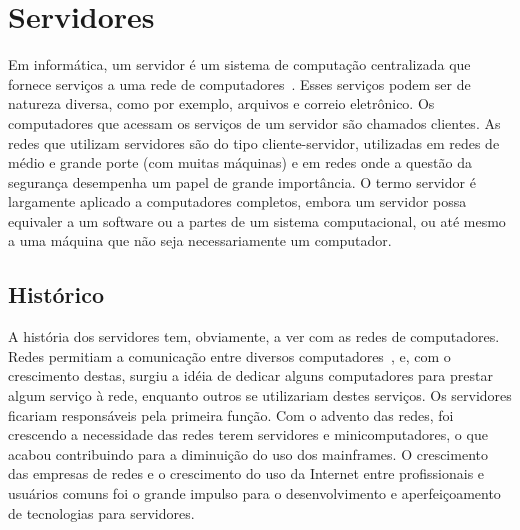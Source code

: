 
\chapter{Servidores}
Em informática, um servidor é um sistema de computação centralizada que fornece serviços a uma rede de computadores~\cite{hunt}. Esses serviços podem ser de natureza diversa, como por exemplo, arquivos e correio eletrônico. Os computadores que acessam os serviços de um servidor são chamados clientes. As redes que utilizam servidores são do tipo cliente-servidor, utilizadas em redes de médio e grande porte (com muitas máquinas) e em redes onde a questão da segurança desempenha um papel de grande importância. O termo servidor é largamente aplicado a computadores completos, embora um servidor possa equivaler a um software ou a partes de um sistema computacional, ou até mesmo a uma máquina que não seja necessariamente um computador.

\section{Histórico}
A história dos servidores tem, obviamente, a ver com as redes de computadores. Redes permitiam a comunicação entre diversos computadores~\cite{tanenbaum}, e, com o crescimento destas, surgiu a idéia de dedicar alguns computadores para prestar algum serviço à rede, enquanto outros se utilizariam destes serviços. Os servidores ficariam responsáveis pela primeira função.
Com o advento das redes, foi crescendo a necessidade das redes terem servidores e minicomputadores, o que acabou contribuindo para a diminuição do uso dos mainframes.
O crescimento das empresas de redes e o crescimento do uso da Internet entre profissionais e usuários comuns foi o grande impulso para o desenvolvimento e aperfeiçoamento de tecnologias para servidores.

